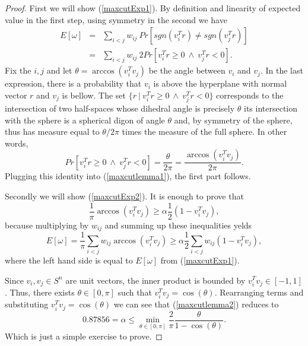 \documentclass[12pt]{book}
\theoremstyle{definition}
\begin{document}
\begin{proof}
First we will show (\ref{maxcutExp1}). 
By definition and linearity of expected value in the first step, using symmetry in the second we have
\begin{eqnarray}
E[\omega] &=& \sum_{i<j} w_{ij} \ Pr\left[sgn(v_i^Tr) \neq sgn(v_j^Tr)\right]  \\
		  &=& \sum_{i<j} w_{ij} \ 2Pr\left[v_i^Tr\geq 0 \ \wedge \ v_j^Tr < 0\right].
		  \label{maxcutlemma1}
\end{eqnarray}
Fix the $i,j$ and let $\theta = \arccos(v_i^Tv_j)$ be the angle between $v_i$ and $v_j$.
In the last expression, there is a probability that $v_i$ is above the hyperplane with normal vector $r$ and $v_j$ is bellow. 
The set $\{r\ | \ v_i^Tr\geq 0 \ \wedge \ v_j^Tr < 0\}$ corresponds to the intersection of two half-spaces whose
dihedral angle is precisely $\theta$ its intersection with the sphere is a spherical
digon of angle $\theta$ and, by symmetry of the sphere, thus has measure equal to
$\theta/2\pi$ times the measure of the full sphere. In other words, 
\begin{equation}
Pr\left[v_i^Tr\geq 0 \ \wedge \ v_j^Tr < 0\right] = \frac{\theta}{2\pi} = \frac{\arccos(v_i^Tv_j)}{2\pi}.
\end{equation}
 Plugging this identity into (\ref{maxcutlemma1}), the first part follows.
 
 Secondly we will show (\ref{maxcutExp2}). It is enough to prove that  
  \begin{equation}
  \label{maxcutlemma2}
\frac{1}{\pi}\arccos(v_i^Tv_j )  \geq \alpha\frac{1}{2}(1-v_i^Tv_j),
 \end{equation}
because multiplying by $w_{ij}$ and summing up these inequalities yelds  
 \begin{equation}
 E[\omega] = 	\frac{1}{\pi}\sum_{i<j}w_{ij}\arccos(v_i^Tv_j )  \geq \alpha\frac{1}{2}\sum_{i<j}w_{ij}(1-v_i^Tv_j),
 \end{equation}
 where the left hand side is equal to $E[\omega]$ from (\ref{maxcutExp1}).
 
 Since $v_i,v_j\in S^n$ are unit vectors, the inner product is bounded by $v_i^Tv_j\in [-1,1]$. Thus, there exists $\theta\in[0,\pi]$ such that $v_i^Tv_j = \cos(\theta)$. Rearranging terms and substituting  $v_i^Tv_j = \cos(\theta)$ we can see that (\ref{maxcutlemma2}) reduces to 
 \begin{equation}
 0.87856 = \alpha \leq \min_{\theta\in[0,\pi]} \frac{2}{\pi}\frac{\theta}{1-\cos(\theta)}.
 \end{equation}
 Which is just a simple exercise to prove.
 
\end{proof}
\end{document}
